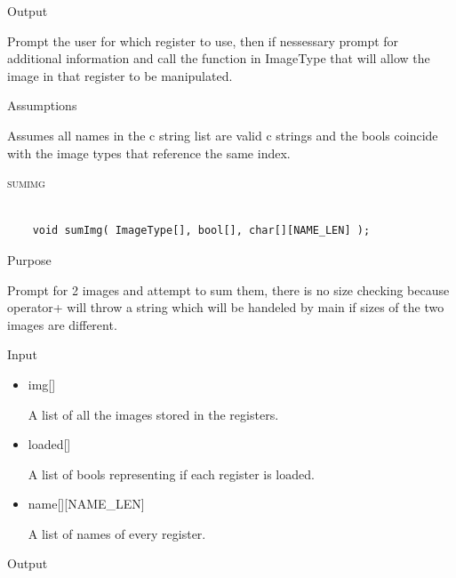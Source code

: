 \documentclass[pdftex, 11pt]{article}
\begin{document}
\begin{description}
\begin{description}
\begin{itemize}
				\end{itemize}

			\item{Output}

				Prompt the user for which register to use, then if nessessary
				prompt for additional information and call the function
				in ImageType that will allow the image in that register to
				be manipulated.

			\item{Assumptions}

				Assumes all names in the c string list are valid c
				strings and the bools coincide with the image types that
				reference the same index.

		\end{description}



	\item{\textsc{sumimg}}

		\begin{lstlisting}

	void sumImg( ImageType[], bool[], char[][NAME_LEN] );
		\end{lstlisting}

		\begin{description}
			\item{Purpose}

				Prompt for 2 images and attempt to sum them, there is no size checking because
				operator+ will throw a string which will be handeled by main if sizes of the
				two images are different.

			\item{Input}

				\begin{itemize}

					\item{img[]}

						A list of all the images stored in the registers.

					\item{loaded[]}

						A list of bools representing if each register is loaded.

					\item{name[][NAME\_LEN]}

						A list of names of every register.

				\end{itemize}

			\item{Output}


\end{description}
\end{description}
\end{document}
